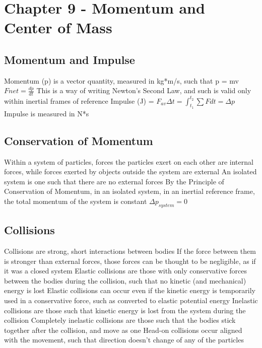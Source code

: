 \documentclass[11 pt, twoside]{article}
\newenvironment{outline*}
{
	\begin{outline}[enumerate]
	}
	{\end{outline}
}
\begin{document}
\section{Chapter 9 - Momentum and Center of Mass}
\subsection{Momentum and Impulse}
\begin{outline*}
\1 Momentum (p) is a vector quantity, measured in kg*m/s, such that p = mv
\1 $Fnet = \frac{dp}{dt}$
\2 This is a way of writing Newton’s Second Law, and such is valid only within inertial frames of reference
\1 Impulse (J) = $F_{av}\Delta t = \int^{t_2}_{t_1} \sum F dt = \Delta p$
\2 Impulse is measured in N*s
\end{outline*}
\subsection{Conservation of Momentum}
\begin{outline*}
\1 Within a system of particles, forces the particles exert on each other are internal forces, while forces exerted by objects outside the system are external
\2 An isolated system is one such that there are no external forces
\1 By the Principle of Conservation of Momentum, in an isolated system, in an inertial reference frame, the total momentum of the system is constant
\2 $\Delta p_{system} = 0$
\end{outline*}
\subsection{Collisions}
\begin{outline*}
\1 Collisions are strong, short interactions between bodies
\2 If the force between them is stronger than external forces, those forces can be thought to be negligible, as if it was a closed system
\1 Elastic collisions are those with only conservative forces between the bodies during the collision, such that no kinetic (and mechanical) energy is lost
\2 Elastic collisions can occur even if the kinetic energy is temporarily used in a conservative force, such as converted to elastic potential energy
\1 Inelastic collisions are those such that kinetic energy is lost from the system during the collision
\2 Completely inelastic collisions are those such that the bodies stick together after the collision, and move as one
\1 Head-on collisions occur aligned with the movement, such that direction doesn’t change of any of the particles
\end{outline*}
\end{document}
